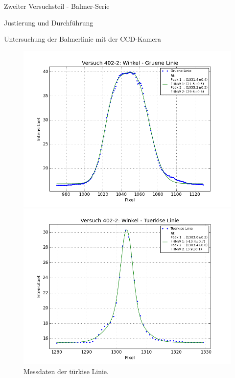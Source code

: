 \documentclass[pdftex, a4paper,11pt, twoside, ngerman]{report}
\begin{document}
\begin{chapter}{Zweiter Versuchsteil - Balmer-Serie}
\begin{section}{Justierung und Durchführung}
\begin{subsection}{Untersuchung der Balmerlinie mit der CCD-Kamera}
\begin{figure}[ht!]
\begin{minipage}{0.48\textwidth}
        \end{minipage}
        \begin{minipage}{0.48\textwidth}
          \centering
          \includegraphics[width=\textwidth]
              {Figures/Versuch402_2_GrueneLinie.png}
          \caption{Messdaten der grüne Linie.}
          \label{fig:Versuch402_2_GrueneLinie}
        \end{minipage}\quad
        \begin{minipage}{0.48\textwidth}
          \centering
          \includegraphics[width=\textwidth]
              {Figures/Versuch402_2_TuerkiseLinie.png}
          \caption{Messdaten der türkise Linie.}
          \label{fig:Versuch402_2_TuerkiseLinie}
        \end{minipage}

\end{figure}
\end{subsection}
\end{section}
\end{chapter}
\end{document}
